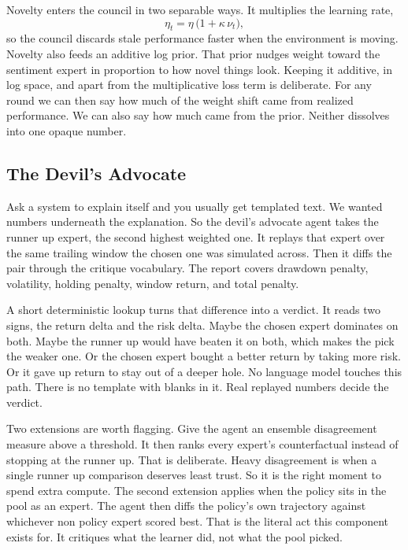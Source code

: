 \documentclass[conference]{IEEEtran}
\begin{document}
Novelty enters the council in two separable ways. It multiplies the learning rate,
\begin{equation}
\eta_t = \eta \,\big(1 + \kappa \, \nu_t\big),
\label{eq:etanovelty}
\end{equation}
so the council discards stale performance faster when the environment is moving. Novelty also feeds an additive log prior. That prior nudges weight toward the sentiment expert in proportion to how novel things look. Keeping it additive, in log space, and apart from the multiplicative loss term is deliberate. For any round we can then say how much of the weight shift came from realized performance. We can also say how much came from the prior. Neither dissolves into one opaque number.

\subsection{The Devil's Advocate}

Ask a system to explain itself and you usually get templated text. We wanted numbers underneath the explanation. So the devil's advocate agent takes the runner up expert, the second highest weighted one. It replays that expert over the same trailing window the chosen one was simulated across. Then it diffs the pair through the critique vocabulary. The report covers drawdown penalty, volatility, holding penalty, window return, and total penalty.

A short deterministic lookup turns that difference into a verdict. It reads two signs, the return delta and the risk delta. Maybe the chosen expert dominates on both. Maybe the runner up would have beaten it on both, which makes the pick the weaker one. Or the chosen expert bought a better return by taking more risk. Or it gave up return to stay out of a deeper hole. No language model touches this path. There is no template with blanks in it. Real replayed numbers decide the verdict.

Two extensions are worth flagging. Give the agent an ensemble disagreement measure above a threshold. It then ranks every expert's counterfactual instead of stopping at the runner up. That is deliberate. Heavy disagreement is when a single runner up comparison deserves least trust. So it is the right moment to spend extra compute. The second extension applies when the policy sits in the pool as an expert. The agent then diffs the policy's own trajectory against whichever non policy expert scored best. That is the literal act this component exists for. It critiques what the learner did, not what the pool picked.
\end{document}
